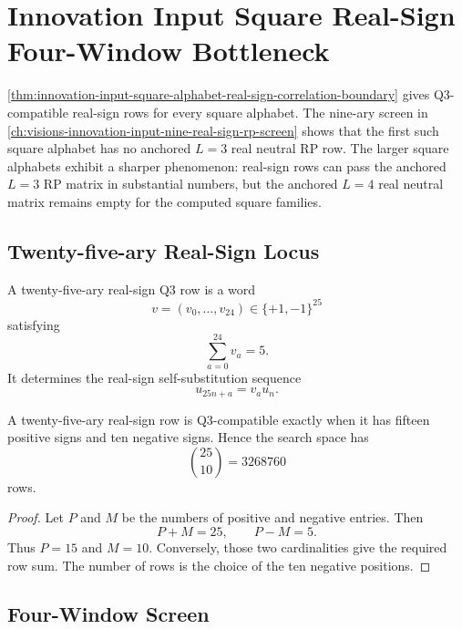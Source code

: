 \chapter{Innovation Input Square Real-Sign Four-Window Bottleneck}
\label{ch:visions-innovation-input-square-real-sign-lfour-bottleneck}

\autoref{thm:innovation-input-square-alphabet-real-sign-correlation-boundary}
gives Q3-compatible real-sign rows for every square alphabet. The
nine-ary screen in
\autoref{ch:visions-innovation-input-nine-real-sign-rp-screen} shows that
the first such square alphabet has no anchored $L=3$ real neutral RP row.
The larger square alphabets exhibit a sharper phenomenon: real-sign rows
can pass the anchored $L=3$ RP matrix in substantial numbers, but the
anchored $L=4$ real neutral matrix remains empty for the computed square
families.

\section{Twenty-five-ary Real-Sign Locus}
\label{sec:innovation-input-twentyfive-real-sign-locus}

\begin{definition}
\label{def:innovation-input-twentyfive-real-sign-qthree-row}
A twenty-five-ary real-sign Q3 row is a word
$$
v=(v_0,\ldots,v_{24})\in\{+1,-1\}^{25}
$$
satisfying
$$
\sum_{a=0}^{24}v_a=5.
$$
It determines the real-sign self-substitution sequence
$$
u_{25n+a}=v_a u_n.
$$
\end{definition}

\begin{proposition}
\label{prop:innovation-input-twentyfive-real-sign-count}
A twenty-five-ary real-sign row is Q3-compatible exactly when it has
fifteen positive signs and ten negative signs. Hence the search space has
$$
\binom{25}{10}=3268760
$$
rows.
\end{proposition}

\begin{proof}
Let $P$ and $M$ be the numbers of positive and negative entries. Then
$$
P+M=25,
\qquad
P-M=5.
$$
Thus $P=15$ and $M=10$. Conversely, those two cardinalities give the
required row sum. The number of rows is the choice of the ten negative
positions.
\end{proof}

\section{Four-Window Screen}
\label{sec:innovation-input-square-real-sign-four-window-screen}

